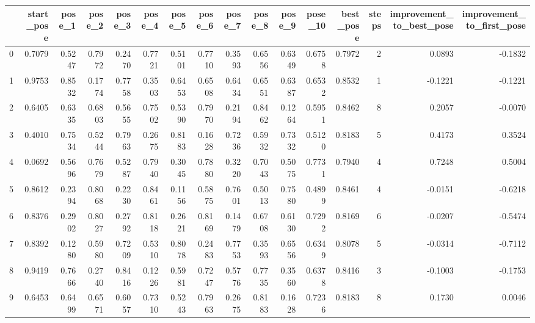 \begin{tabular}{lrrrrrrrrrrrrrrr}
\toprule
{} &  start\_pose &  pose\_1 &  pose\_2 &  pose\_3 &  pose\_4 &  pose\_5 &  pose\_6 &  pose\_7 &  pose\_8 &  pose\_9 &  pose\_10 &  best\_pose &  steps &  improvement\_to\_best\_pose &  improvement\_to\_first\_pose \\
\midrule
0 &      0.7079 &  0.5247 &  0.7972 &  0.2470 &  0.7721 &  0.5101 &  0.7710 &  0.3593 &  0.6556 &  0.6349 &   0.6758 &     0.7972 &      2 &                    0.0893 &                    -0.1832 \\
1 &      0.9753 &  0.8532 &  0.1774 &  0.7758 &  0.3503 &  0.6453 &  0.6508 &  0.6434 &  0.6551 &  0.6387 &   0.6532 &     0.8532 &      1 &                   -0.1221 &                    -0.1221 \\
2 &      0.6405 &  0.6335 &  0.6803 &  0.5655 &  0.7502 &  0.5390 &  0.7970 &  0.2194 &  0.8462 &  0.1264 &   0.5951 &     0.8462 &      8 &                    0.2057 &                    -0.0070 \\
3 &      0.4010 &  0.7534 &  0.5244 &  0.7963 &  0.2675 &  0.8183 &  0.1628 &  0.7236 &  0.5932 &  0.7332 &   0.5120 &     0.8183 &      5 &                    0.4173 &                     0.3524 \\
4 &      0.0692 &  0.5696 &  0.7679 &  0.5287 &  0.7940 &  0.3045 &  0.7880 &  0.3220 &  0.7043 &  0.5075 &   0.7731 &     0.7940 &      4 &                    0.7248 &                     0.5004 \\
5 &      0.8612 &  0.2394 &  0.8068 &  0.2230 &  0.8461 &  0.1156 &  0.5875 &  0.7601 &  0.5013 &  0.7580 &   0.4899 &     0.8461 &      4 &                   -0.0151 &                    -0.6218 \\
6 &      0.8376 &  0.2902 &  0.8027 &  0.2792 &  0.8118 &  0.2621 &  0.8169 &  0.1479 &  0.6708 &  0.6130 &   0.7292 &     0.8169 &      6 &                   -0.0207 &                    -0.5474 \\
7 &      0.8392 &  0.1280 &  0.5980 &  0.7209 &  0.5310 &  0.8078 &  0.2483 &  0.7753 &  0.3593 &  0.6556 &   0.6349 &     0.8078 &      5 &                   -0.0314 &                    -0.7112 \\
8 &      0.9419 &  0.7666 &  0.2740 &  0.8416 &  0.1226 &  0.5981 &  0.7247 &  0.5776 &  0.7735 &  0.3560 &   0.6378 &     0.8416 &      3 &                   -0.1003 &                    -0.1753 \\
9 &      0.6453 &  0.6499 &  0.6571 &  0.6057 &  0.7310 &  0.5243 &  0.7963 &  0.2675 &  0.8183 &  0.1628 &   0.7236 &     0.8183 &      8 &                    0.1730 &                     0.0046 \\
\bottomrule
\end{tabular}
